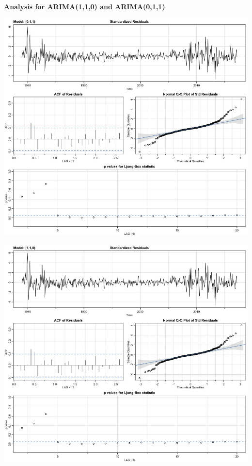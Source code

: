\documentclass[paper=letter, fontsize=11pt]{scrartcl}
\begin{document}
\textbf{Analysis for ARIMA(1,1,0) and ARIMA(0,1,1)}

\begin{minipage}{\textwidth}
  \begin{minipage}[b]{0.49\textwidth}
    \centering
    \includegraphics[width=\linewidth]{Image/bj011.jpeg}
    \label{fig:arima011}
  \end{minipage}
  \hfill
  \begin{minipage}[b]{0.49\textwidth}
    \centering
    \includegraphics[width=\linewidth]{Image/bj110.jpeg}
    \label{fig:arima110}
  \end{minipage}
\end{minipage}



\newpage
\printbibliography
\end{document}
